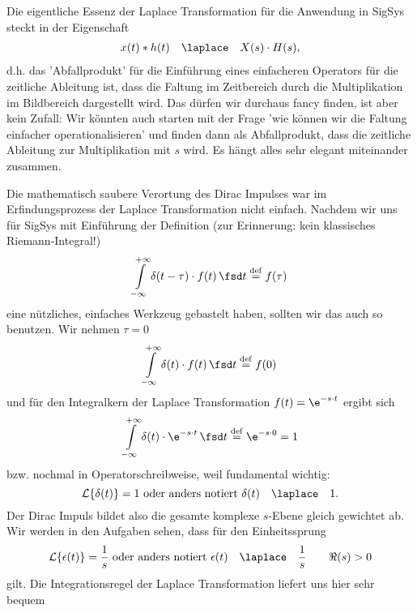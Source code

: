 Die eigentliche Essenz der Laplace Transformation für die Anwendung in
SigSys steckt in der Eigenschaft
\begin{align}
\label{eq:laplace_intro_ast_mult}
x(t) \ast h(t) \quad\laplace\quad X(s) \cdot H(s),
\end{align}
d.h. das 'Abfallprodukt' für die Einführung eines einfacheren Operators
für die zeitliche Ableitung ist, dass die Faltung im Zeitbereich durch die
Multiplikation im Bildbereich dargestellt wird. Das dürfen wir durchaus fancy finden, ist aber
kein Zufall: Wir könnten auch starten mit der Frage 'wie können wir die Faltung
einfacher operationalisieren' und finden dann als Abfallprodukt, dass die
zeitliche Ableitung zur Multiplikation mit $s$ wird. Es hängt alles sehr elegant
miteinander zusammen.

Die mathematisch saubere Verortung des Dirac Impulses war im Erfindungsprozess
der Laplace Transformation nicht einfach. Nachdem wir uns für SigSys mit Einführung
der Definition (zur Erinnerung: kein klassisches Riemann-Integral!)
\begin{equation}
\int\limits_{-\infty}^{+\infty} \delta(t-\tau) \cdot f(t) \, \fsd t \stackrel{\mathrm{def}}= f(\tau)
\end{equation}
eine nützliches, einfaches Werkzeug gebastelt haben, sollten wir das auch so
benutzen.
Wir nehmen $\tau=0$
\begin{equation}
\int\limits_{-\infty}^{+\infty} \delta(t) \cdot f(t) \, \fsd t \stackrel{\mathrm{def}}= f(0)
\end{equation}
und für den Integralkern der Laplace Transformation $f(t)=\e^{-s \cdot t}$
ergibt sich
\begin{equation}
\int\limits_{-\infty}^{+\infty} \delta(t) \cdot \e^{-s \cdot t} \, \fsd t \stackrel{\mathrm{def}}= \e^{-s \cdot 0} = 1
\end{equation}
bzw. nochmal in Operatorschreibweise, weil fundamental wichtig:
%
\begin{equation}
  \mathcal{L}\{\delta(t)\} = 1
  \text{ oder anders notiert }
  \delta(t) \quad\laplace\quad 1.
\end{equation}
%
Der Dirac Impuls bildet also die gesamte komplexe $s$-Ebene gleich gewichtet ab.
%
Wir werden in den Aufgaben sehen, dass für den Einheitssprung
\begin{equation}
  \mathcal{L}\{\epsilon(t)\} = \frac{1}{s}
  \text{ oder anders notiert }
  \epsilon(t) \quad\laplace\quad \frac{1}{s} \qquad \Re(s)>0
\end{equation}
gilt.
Die Integrationsregel der Laplace Transformation liefert uns hier sehr bequem
